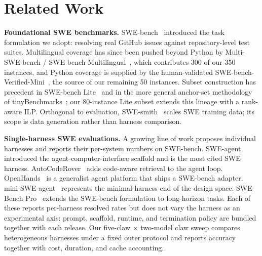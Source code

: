 \section{Related Work}\label{sec:related}



\textbf{Foundational SWE benchmarks.}
SWE-bench~\cite{jimenez_swebench_2024} introduced the task formulation we adopt: resolving real GitHub issues against repository-level test suites. Multilingual coverage has since been pushed beyond Python by Multi-SWE-bench / SWE-bench-Multilingual~\cite{swe_smith}, which contributes 300 of our 350 instances, and Python coverage is supplied by the human-validated SWE-bench-Verified-Mini~\cite{swebench_verified_mini}, the source of our remaining 50 instances. Subset construction has precedent in SWE-bench Lite~\cite{swebench_lite} and in the more general anchor-set methodology of tinyBenchmarks~\cite{tinybenchmarks}; our 80-instance Lite subset extends this lineage with a rank-aware ILP. Orthogonal to evaluation, SWE-smith~\cite{swe_smith} scales SWE training data; its scope is data generation rather than harness comparison.

\textbf{Single-harness SWE evaluations.}
A growing line of work proposes individual harnesses and reports their per-system numbers on SWE-bench. SWE-agent~\cite{swe_agent} introduced the agent-computer-interface scaffold and is the most cited SWE harness. AutoCodeRover~\cite{zhang_autocoderover} adds code-aware retrieval to the agent loop. OpenHands~\cite{wang_openhands} is a generalist agent platform that ships a SWE-bench adapter. mini-SWE-agent~\cite{mini_swe_agent} represents the minimal-harness end of the design space. SWE-Bench Pro~\cite{deng_swebench_pro} extends the SWE-bench formulation to long-horizon tasks. Each of these reports per-harness resolved rates but does not vary the harness as an experimental axis: prompt, scaffold, runtime, and termination policy are bundled together with each release. Our five-claw $\times$ two-model claw sweep compares heterogeneous harnesses under a fixed outer protocol and reports accuracy together with cost, duration, and cache accounting.

